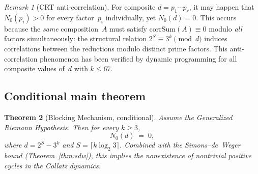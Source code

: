 \documentclass[12pt, a4paper]{amsart}
\theoremstyle{plain}
\newtheorem{theorem}{Theorem}[section]
\theoremstyle{definition}
\theoremstyle{remark}
\newtheorem{remark}[theorem]{Remark}
\newcommand{\corrSum}{\mathrm{corrSum}}
\begin{document}
\begin{remark}[CRT anti-correlation]\label{rem:crt-anti}
  For composite $d = p_1 \cdots p_r$, it may happen that
  $N_0(p_i) > 0$ for every factor~$p_i$ individually,
  yet $N_0(d) = 0$.
  This occurs because the \emph{same} composition~$A$ must
  satisfy $\corrSum(A) \equiv 0$ modulo \emph{all} factors
  simultaneously: the structural relation
  $2^S \equiv 3^k \pmod{d}$ induces correlations between
  the reductions modulo distinct prime factors.
  This anti-correlation phenomenon has been verified by
  dynamic programming for all composite values
  of~$d$ with $k \leq 67$.
\end{remark}

\subsection{Conditional main theorem}\label{ssec:conditional-main}

\begin{theorem}[Blocking Mechanism, conditional]%
\label{thm:blocking-conditional}
  Assume the Generalized Riemann Hypothesis.
  Then for every $k \geq 3$,
  \[
    N_0(d) \;=\; 0,
  \]
  where $d = 2^S - 3^k$ and $S = \lceil k \log_2 3 \rceil$.
  Combined with the Simons--de~Weger bound
  (Theorem~\ref{thm:sdw}), this implies the nonexistence
  of nontrivial positive cycles in the Collatz dynamics.
\end{theorem}
\end{document}
